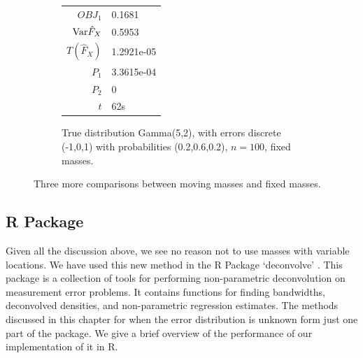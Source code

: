 \begin{figure}
\begin{subfigure}[b]{0.38\textwidth}
		\begin{tabular}{r l}
			$OBJ_1$ & 0.1681\\
			$\mathrm{Var} \hat{F}_X$ & 0.5953\\
			$T(\hat{F}_X)$ & 1.2921e-05\\
			$P_1$ & 3.3615e-04\\
			$P_2$ & 0\\
			$t$ & 62s
		\end{tabular}
		\caption{True distribution Gamma(5,2), with errors discrete (-1,0,1) with probabilities (0.2,0.6,0.2), $n = 100$, fixed masses.}
		\label{fig:fixed masses gamma discrete}
	\end{subfigure}
	\caption{Three more comparisons between moving masses and fixed masses.}
	\label{fig:more deconvolution examples}
	\end{figure}

\subsection{R Package}
Given all the discussion above, we see no reason not to use masses with variable locations. We have used this new method in the R \cite{R_Core_Team2018-bs} Package `deconvolve' \cite{Delaigle2019-hj}. This package is a collection of tools for performing non-parametric deconvolution on measurement error problems. It contains functions for finding bandwidths, deconvolved densities, and non-parametric regression estimates. The methods discussed in this chapter for when the error distribution is unknown form just one part of the package. We give a brief overview of the performance of our implementation of it in R.

